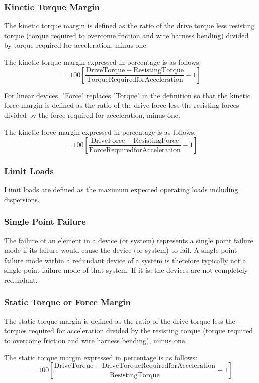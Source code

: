 \documentclass[12pt]{article}
\begin{document}
\subsubsection{Kinetic Torque Margin}
The kinetic torque margin is defined as the ratio of the drive torque less resisting torque (torque required to overcome friction and wire harness bending) divided by torque required for acceleration, minus one.

The kinetic torque margin expressed in percentage is as follows:
$$ = 100 \left[ \frac{\mathrm{Drive Torque - Resisting Torque}}{\mathrm{Torque Required for Acceleration}} - 1\right] $$

For linear devices, "Force" replaces "Torque" in the definition so that the kinetic force margin is defined as the ratio of the drive force less the resisting forces divided by the force required for acceleration, minus one.

The kinetic force margin expressed in percentage is as follows:
$$ = 100 \left[ \frac{\mathrm{Drive Force - Resisting Force}}{\mathrm{Force Required for Acceleration}} - 1\right] $$

\subsubsection{Limit Loads}
Limit loads are defined as the maximum expected operating loads including dispersions.

\subsubsection{Single Point Failure}
The failure of an element in a device (or system) represents a single point failure mode if its failure would cause the device (or system) to fail. 
A single point failure mode within a redundant device of a system is therefore typically not a single point failure mode of that system. 
If it is, the devices are not completely redundant.

\subsubsection{Static Torque or Force Margin}
The static torque margin is defined as the ratio of the drive torque less the torques required for acceleration divided by the resisting torque (torque required to overcome friction and wire harness bending), minus one.

The static torque margin expressed in percentage is as follows:
$$ = 100 \left[ \frac{\mathrm{Drive Torque - Drive Torque Required for Acceleration}}{\mathrm{Resisting Torque}} - 1\right] $$
\end{document}
